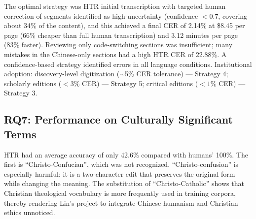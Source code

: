 \documentclass[final]{anthology-ch} %
\begin{document}
The optimal strategy was HTR initial transcription with targeted human correction of segments identified as high-uncertainty (confidence $< 0.7$, covering about 34\% of the content), and this achieved a final CER of 2.14\% at \$8.45 per page (66\% cheaper than full human transcription) and 3.12 minutes per page (83\% faster). Reviewing only code-switching sections was insufficient; many mistakes in the Chinese-only sections had a high HTR CER of 22.88\%. A confidence-based strategy identified errors in all language conditions. Institutional adoption: discovery-level digitization ($\sim$5\% CER tolerance) --- Strategy 4; scholarly editions ($<3\%$ CER) --- Strategy 5; critical editions ($<1\%$ CER) --- Strategy 3.

\subsection{RQ7: Performance on Culturally Significant Terms}

\begin{table}[h]
  \centering
  \small
  \caption{HTR performance in culturally significant areas.}
  \label{tab:cultural}
\end{table}

HTR had an average accuracy of only 42.6\% compared with humans' 100\%. The first is \enquote{Christo-Confucian}, which was not recognized. \enquote{Christo-confusion} is especially harmful: it is a two-character edit that preserves the original form while changing the meaning. The substitution of \enquote{Christo-Catholic} shows that Christian theological vocabulary is more frequently used in training corpora, thereby rendering Lin's project to integrate Chinese humanism and Christian ethics unnoticed.
\end{document}
